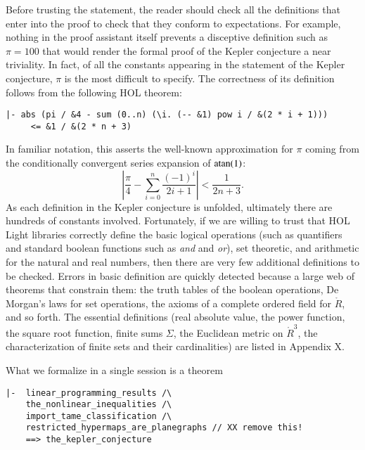 Before trusting the statement, the reader should check all the definitions that enter into the proof to check that they
conform to expectations.   For example, nothing in the proof assistant itself prevents a disceptive definition 
such as $\pi=100$ that would render the formal proof of the Kepler conjecture a near triviality.  In fact, of all the constants
appearing in the statement of the Kepler conjecture, $\pi$ is the most difficult to specify.   The correctness of its definition
follows from the following HOL theorem:

\begin{obeylines}

\begin{verbatim}
|- abs (pi / &4 - sum (0..n) (\i. (-- &1) pow i / &(2 * i + 1))) 
     <= &1 / &(2 * n + 3)
\end{verbatim}

\end{obeylines}

In familiar notation, this asserts the well-known approximation for $\pi$ coming from the conditionally convergent
series expansion of  ${\operatorname{atan}}(1)$:
\[
   \left| \frac{\pi}{4} - \sum_{i=0}^n \frac { (-1)^i } { 2 i + 1} \right | < \frac {1} {2 n + 3}.
\]
As each definition in the Kepler conjecture is unfolded, ultimately there are hundreds of constants involved.
Fortunately, if we are willing to trust that HOL Light libraries correctly define the basic logical operations (such as quantifiers and
standard boolean functions such as {\it and} and {\it or}),  set theoretic, and arithmetic for the natural and real numbers, then
there are very few additional definitions to be checked.  Errors in basic definition are quickly detected because a large
web of theorems that constrain them:
the truth tables of the boolean operations, De Morgan's laws for  set operations, 
the axioms of a complete ordered field for $\ring{R}$, and so forth.
The essential definitions (real absolute value, the power function, the square root function, finite sums $\Sigma$,
the Euclidean metric on $\ring{R}^3$,  the characterization of finite sets and their cardinalities) are listed in Appendix X.

What we formalize in a single session is a theorem

\begin{obeylines}

\begin{verbatim}
|-  linear_programming_results /\ 
    the_nonlinear_inequalities /\
    import_tame_classification /\ 
    restricted_hypermaps_are_planegraphs // XX remove this!
    ==> the_kepler_conjecture
\end{verbatim}

\end{obeylines}


